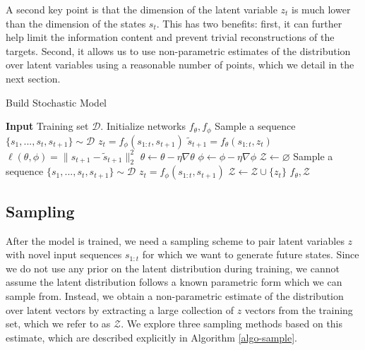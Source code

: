 \documentclass{article}
\begin{document}
A second key point is that the dimension of the latent variable $z_t$ is much lower than the dimension of the states $s_t$. This has two benefits: first, it can further help limit the information content and prevent trivial reconstructions of the targets. Second, it allows us to use non-parametric estimates of the distribution over latent variables using a reasonable number of points, which we detail in the next section.



\begin{algorithm}[t]
  \caption{Build Stochastic Model}\label{algo-train}
  \begin{algorithmic}[1]
    \State \textbf{Input} Training set $\mathcal{D}$.
    \State Initialize networks $f_\theta, f_\phi$
     
    \State Sample a sequence $\{s_1, ..., s_t, s_{t+1}\} \sim \mathcal{D}$
    \State $z_t = f_{\phi}(s_{1:t}, s_{t+1})$
    \State $\tilde{s}_{t+1} = f_{\theta}(s_{1:t}, z_t)$
    \State $\ell(\theta, \phi) = \|s_{t+1} - \tilde{s}_{t+1} \|_2^2$
    \State $\theta \leftarrow \theta - \eta \nabla \theta$
    \State $\phi \leftarrow \phi - \eta \nabla \phi$
    \EndWhile
    \State $\mathcal{Z} \leftarrow \varnothing$     
    \State Sample a sequence $\{s_1, ..., s_t, s_{t+1}\} \sim \mathcal{D}$
    \State $z_t = f_{\phi}(s_{1:t}, s_{t+1})$
    \State $\mathcal{Z} \leftarrow \mathcal{Z} \cup \{ z_t \}$
    \EndFor
    \Return $f_\theta, \mathcal{Z}$
  \end{algorithmic}
\end{algorithm}



\subsection{Sampling}

After the model is trained, we need a sampling scheme to pair latent variables $z$ with novel input sequences $s_{1:t}$ for which we want to generate future states.
Since we do not use any prior on the latent distribution during training, we cannot assume the latent distribution follows a known parametric form which we can sample from.
Instead, we obtain a non-parametric estimate of the distribution over latent vectors by extracting a large collection of $z$ vectors from the training set, which we refer to as $\mathcal{Z}$.
We explore three sampling methods based on this estimate, which are described explicitly in Algorithm \ref{algo-sample}.
\end{document}
